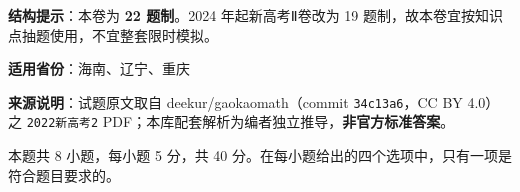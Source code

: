 

\begin{gknotice}
\textbf{结构提示}：本卷为 \textbf{22 题制}。2024 年起新高考Ⅱ卷改为 19 题制，故本卷宜按知识点抽题使用，不宜整套限时模拟。

\textbf{适用省份}：海南、辽宁、重庆

\textbf{来源说明}：试题原文取自 deekur/gaokaomath（commit \texttt{34c13a6}，CC BY 4.0）之 \texttt{2022新高考2} PDF；本库配套解析为编者独立推导，\textbf{非官方标准答案}。
\end{gknotice}

\par\medskip


\begin{gktip}
本题共 8 小题，每小题 5 分，共 40 分。在每小题给出的四个选项中，只有一项是符合题目要求的。
\end{gktip}


